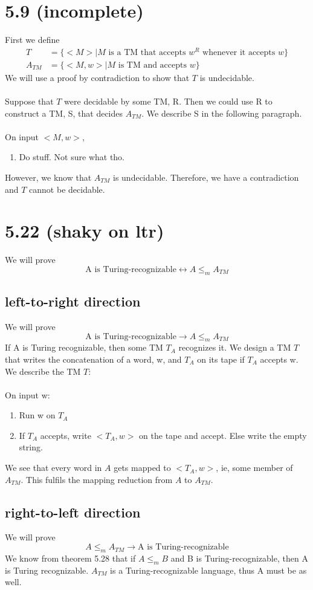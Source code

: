 \documentclass{article}
\begin{document}
\section*{5.9 (incomplete)}

First we define
\begin{align*}
    T &= \{ <M> | M \textrm{ is a TM that accepts } w^R  \textrm{ whenever it accepts } w \}\\
    A_{TM} &= \{ <M, w> | M \textrm{ is TM and accepts } w \} 
\end{align*} 
We will use a proof by contradiction to show that $T$ is undecidable.\\\\
Suppose that $T$ were decidable by some TM, R. Then we could use R to construct a TM, S, that decides $A_{TM}$. We describe S in the following paragraph.\\\\
On input $<M, w>$, 
\begin{enumerate}
    \item Do stuff. Not sure what tho.
\end{enumerate}
However, we know that $A_{TM}$ is undecidable. Therefore, we have a contradiction and $T$ cannot be decidable.

\section*{5.22 (shaky on ltr)}

We will prove 
$$
\textrm{A is Turing-recognizable} \leftrightarrow A \leq_m A_{TM}
$$

\subsection*{left-to-right direction}
We will prove
$$\textrm{A is Turing-recognizable} \rightarrow A \leq_m A_{TM}$$
If A is Turing recognizable, then some TM $T_A$ recognizes it. We design a TM $T$ that writes the concatenation of a word, w, and $T_A$ on its tape if $T_A$ accepts w. We describe the TM $T$:\\\\
On input w:
\begin{enumerate}
    \item Run w on $T_A$
    \item If $T_A$ accepts, write $<T_A, w>$ on the tape and accept. Else write the empty string.
\end{enumerate}
We see that every word in $A$ gets mapped to $<T_A, w>$, ie, some member of $A_{TM}$.
This fulfils the mapping reduction from $A$ to $A_{TM}$.

\subsection*{right-to-left direction}
We will prove
$$A \leq_m A_{TM} \rightarrow \textrm{A is Turing-recognizable}$$
We know from theorem 5.28 that if $A \leq_m B$ and B is Turing-recognizable, then A is Turing recognizable. $A_{TM}$ is a Turing-recognizable language, thus A must be as well.
\end{document}
